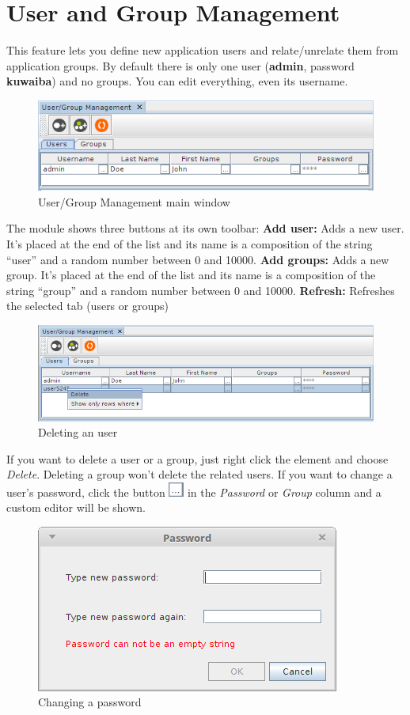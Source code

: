 \documentclass[a4paper]{article}
\begin{document}
		\section{User and Group Management} \label{sec:user_and_group_management}
		This feature lets you define new application users and relate/unrelate them from application groups. By default there is only one user (\textbf{admin}, password \textbf{kuwaiba}) and no groups.  You can edit everything, even its username.
		\begin{figure}[h!]
			\centering
			\includegraphics[width=0.7\linewidth]{img/users_and_groups_default_user.png}
			\caption{User/Group Management main window}
			\label{fig:users_and_groups_default_user}
		\end{figure}
		The module shows three buttons at its own toolbar:
		\textbf{Add user:} Adds a new user. It's placed at the end of the list and its name is a composition of the string “user” and a random number between 0 and 10000.
		\textbf{Add groups:} Adds a new group. It's placed at the end of the list and its name is a composition of the string “group” and a random number between 0 and 10000.
		\textbf{Refresh:} Refreshes the selected tab (users or groups)	
		\begin{figure}[h!]
			\centering
			\includegraphics[width=0.6\linewidth]{img/users_and_groups_delete.png}
			\caption{Deleting an user}
			\label{fig:users_and_groups_delete}
		\end{figure}
		
		If you want to delete a user or a group, just right click the element and choose \textit{Delete}. Deleting a group won't delete the related users. If you want to change a user's password, click the button  \includegraphics[width=0.5cm]{img/icon_edit_user.png} in the \textit{Password} or \textit{Group} column and a custom editor will be shown.
		\begin{figure}[h!]
			\centering
			\includegraphics[width=0.3\linewidth]{img/users_and_groups_change_password.png}
			\caption{Changing a password}
			\label{fig:users_and_groups_change_password}
		\end{figure}
	
\end{document}
